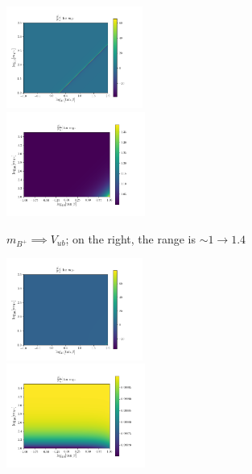 \documentclass[11pt]{article}
\begin{document}
\begin{figure}[H]
    \centering
    \begin{subfigure}[b]{\textwidth}
        \includegraphics[width=0.49\textwidth]{heatmaps/mB-rH0.png}
        \includegraphics[width=0.5\textwidth]{heatmaps/mB-rH1.png}
        \caption{$m_{B^+} \implies V_{ub}$; on the right, the range is $\sim1\to1.4$}
    \end{subfigure}
    \begin{subfigure}[b]{\textwidth}
        \includegraphics[width=0.49\textwidth]{heatmaps/mD-rH0.png}
        \includegraphics[width=0.5\textwidth]{heatmaps/mD-rH1.png}

\end{subfigure}
\end{figure}
\end{document}
